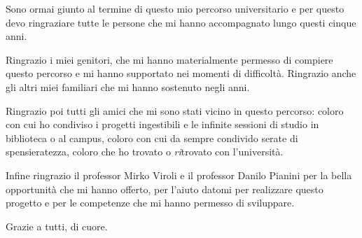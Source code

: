 
Sono ormai giunto al termine di questo mio percorso universitario
e per questo devo ringraziare tutte le persone che mi hanno accompagnato lungo questi cinque anni.

Ringrazio i miei genitori, che mi hanno materialmente permesso di compiere questo percorso e mi hanno supportato nei momenti di difficoltà.
Ringrazio anche gli altri miei familiari che mi hanno sostenuto negli anni.

Ringrazio poi tutti gli amici che mi sono stati vicino in questo percorso:
coloro con cui ho condiviso i progetti ingestibili e le infinite sessioni di studio in biblioteca o al campus,
coloro con cui da sempre condivido serate di spensieratezza,
coloro che ho trovato o \emph{ri}trovato con l'università.

Infine ringrazio il professor Mirko Viroli e il professor Danilo Pianini
per la bella opportunità che mi hanno offerto,
per l'aiuto datomi per realizzare questo progetto
e per le competenze che mi hanno permesso di sviluppare.

Grazie a tutti, di cuore.
